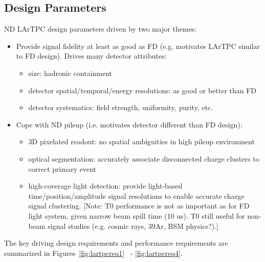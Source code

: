 \subsection{Design Parameters}
\label{sec:lartpc-ovvw-param}
ND LArTPC design parameters driven by two major themes:
\begin{itemize}
    \item Provide signal fidelity at least as good as FD (e.g. motivates LArTPC similar to FD design).  Drives many detector attributes:
    \begin{itemize}
        \item size: hadronic containment
        \item detector spatial/temporal/energy resolutions: as good or better than FD
        \item detector systematics: field strength, uniformity, purity, etc.
    \end{itemize}
    \item Cope with ND pileup (i.e. motivates detector different than FD design):
    \begin{itemize}
        \item 3D pixelated readout: no spatial ambiguities in high pileup environment
        \item optical segmentation: accurately associate disconnected charge clusters to correct primary event
        \item high-coverage light detection: provide light-based time/position/amplitude signal resolutions to enable accurate charge signal clustering. [Note: T0 performance is not as important as for FD light system, given narrow beam spill time (10 us).  T0 still useful for non-beam signal studies (e.g. cosmic rays, 39Ar, BSM physics?).]
    \end{itemize}
\end{itemize}

The key driving design requirements and performance requirements are summarized in Figures~\ref{fig:lartpcreq1}~ - \ref{fig:lartpcreq4}. 


